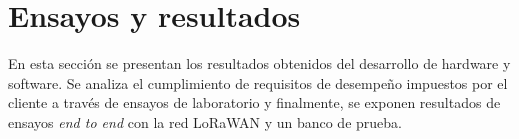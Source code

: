 
\chapter{Ensayos y resultados} %
En esta sección se presentan los resultados obtenidos del desarrollo de hardware y software. Se analiza el cumplimiento de requisitos de desempeño impuestos por el cliente a trav\'{e}s de ensayos de laboratorio y finalmente, se exponen resultados de ensayos \textit{end to end} con la red LoRaWAN y un banco de prueba.\\
\label{Chapter4} %
